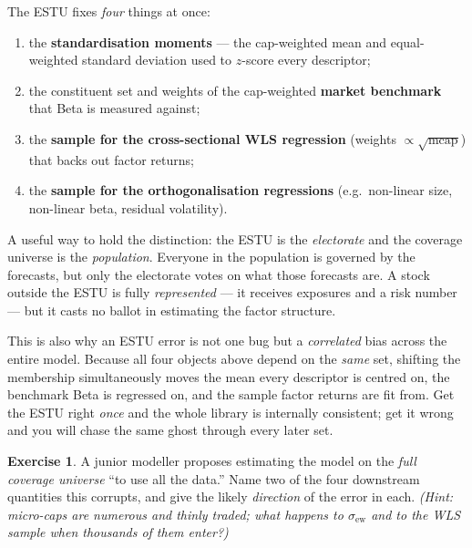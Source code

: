 \documentclass[11pt]{article}
\theoremstyle{definition}
\newtheorem{exercise}{Exercise}[section]
\theoremstyle{plain}
\theoremstyle{remark}
\begin{document}
\begin{keyresult}
The ESTU fixes \emph{four} things at once:
\begin{enumerate}[nosep,leftmargin=1.6em]
  \item the \textbf{standardisation moments} --- the cap-weighted mean and equal-weighted standard deviation used to $z$-score every descriptor;
  \item the constituent set and weights of the cap-weighted \textbf{market benchmark} that Beta is measured against;
  \item the \textbf{sample for the cross-sectional WLS regression} (weights $\propto\sqrt{\text{mcap}}$) that backs out factor returns;
  \item the \textbf{sample for the orthogonalisation regressions} (e.g.\ non-linear size, non-linear beta, residual volatility).
\end{enumerate}
\end{keyresult}

\begin{intuition}
A useful way to hold the distinction: the ESTU is the \emph{electorate} and the coverage universe is the \emph{population}. Everyone in the population is governed by the forecasts, but only the electorate votes on what those forecasts are. A stock outside the ESTU is fully \emph{represented} --- it receives exposures and a risk number --- but it casts no ballot in estimating the factor structure.

This is also why an ESTU error is not one bug but a \emph{correlated} bias across the entire model. Because all four objects above depend on the \emph{same} set, shifting the membership simultaneously moves the mean every descriptor is centred on, the benchmark Beta is regressed on, and the sample factor returns are fit from. Get the ESTU right \emph{once} and the whole library is internally consistent; get it wrong and you will chase the same ghost through every later set.
\end{intuition}

\begin{exercise}
A junior modeller proposes estimating the model on the \emph{full coverage universe} ``to use all the data.'' Name two of the four downstream quantities this corrupts, and give the likely \emph{direction} of the error in each. \emph{(Hint: micro-caps are numerous and thinly traded; what happens to $\sigma_{\text{ew}}$ and to the WLS sample when thousands of them enter?)}
\end{exercise}
\end{document}
